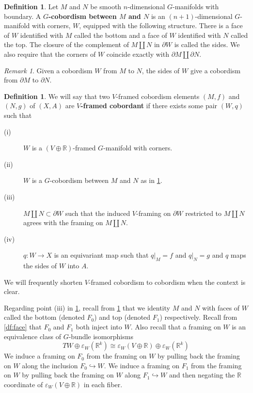 \documentclass[11pt]{amsart}
\newcommand{\R}{\mathbb R}
\theoremstyle{plain}   %
\theoremstyle{definition}
\newtheorem{df}[thm]{Definition}
\theoremstyle{remark}
\newtheorem{rmk}[thm]{Remark}
\numberwithin{equation}{section}
\begin{document}
\begin{df}\label{df:G-cobordism}
Let $M$ and $N$ be smooth $n$-dimensional $G$-manifolds with boundary. A \textbf{$G$-cobordism between $M$ and $N$} is an $(n+1)$-dimensional $G$-manifold with corners, $W$, equipped with the following structure. There is a face of $W$ identified with $M$ called the bottom and a face of $W$ identified with $N$ called the top. The closure of the complement of $M\amalg N$ in $\partial W$ is called the sides. We also require that the corners of $W$ coincide exactly with $\partial M\amalg \partial N$.
\end{df}

\begin{rmk}
Given a cobordism $W$ from $M$ to $N$, the sides of $W$ give a cobordism from $\partial M$ to $\partial N$. 
\end{rmk}

\begin{df}\label{df:cobordism}
We will say that two $V$-framed cobordism elements $(M,f)$ and $(N,g)$ of $(X,A)$ are \textbf{$V$-framed cobordant} if there exists some pair $(W,q)$ such that 
\begin{description}
\item[(i)] $W$ is a $(V\oplus \R)$-framed $G$-manifold with corners.
\item[(ii)] $W$ is a $G$-cobordism between $M$ and $N$ as in \cref{df:G-cobordism}. 
\item[(iii)] $M\amalg N\subset \partial W$ such that the induced $V$-framing on $\partial W$ restricted to $M \amalg N$ agrees with the framing on $M\amalg N$.
\item[(iv)] $q:W\to X$ is an equivariant map such that $q|_{M}=f$ and $q|_{N}=g$ and $q$ maps the sides of $W$ into $A$. 
\end{description}
We will frequently shorten $V$-framed cobordism to cobordism when the context is clear.
\end{df}

Regarding point (iii) in \cref{df:cobordism}, recall from \cref{df:G-cobordism} that we identity $M$ and $N$ with faces of $W$ called the bottom (denoted $F_0$) and top (denoted $F_1$) respectively. Recall from \cref{df:face} that $F_0$ and $F_1$ both inject into $W$. Also recall that a framing on $W$ is an equivalence class of $G$-bundle isomorphisms
\[
TW\oplus \varepsilon_W(\R^k) \cong \varepsilon_W(V\oplus\R)\oplus\varepsilon_W(\R^k)
\]
We induce a framing on $F_0$ from the framing on $W$ by pulling back the framing on $W$ along the inclusion $F_0\hookrightarrow W$. We induce a framing on $F_1$ from the framing on $W$ by pulling back the framing on $W$ along $F_1\hookrightarrow W$ and then negating the $\R$ coordinate of $\varepsilon_W(V\oplus \R)$ in each fiber.
\end{document}

